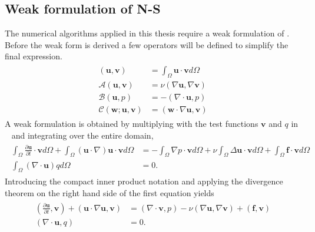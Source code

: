 \subsection{Weak formulation of N-S}
The numerical algorithms applied in this thesis require a weak formulation of .
Before the weak form is derived a few operators will be defined to simplify the final 
expression.
%
\begin{align}
    \begin{split}
    ( \mathbf{u},\mathbf{v}) &= \int_{\Omega}\mathbf{u} \cdot \mathbf{v} d\Omega\\
    \mathcal{A}(\mathbf{u},\mathbf{v}) &= \nu(\nabla \mathbf{u},\nabla \mathbf{v})\\
    \mathcal{B}(\mathbf{u},p) &= -(\nabla \cdot \mathbf{u},p)\\
    \mathcal{C}(\mathbf{w};\mathbf{u},\mathbf{v}) &= (\mathbf{w}\cdot \nabla \mathbf{u},\mathbf{v})
    \end{split}
    \label{eq:weakoperators}
\end{align}
%
A weak formulation is obtained by multiplying with the test functions $\mathbf{v}$ and $q$ in ~ and integrating over
the entire domain,
\begin{align}
    \begin{split}
        \int_{\Omega}\frac{\partial \mathbf{u}}{\partial t}\cdot\mathbf{v}d\Omega
        + \int_{\Omega}(\mathbf{u}\cdot \nabla)\mathbf{u}\cdot\mathbf{v}d\Omega
        &= -\int_{\Omega}\nabla p\cdot \mathbf{v} d\Omega 
        + \nu \int_{\Omega}\Delta\mathbf{u}\cdot\mathbf{v}d\Omega
        + \int_{\Omega}\mathbf{f}\cdot \mathbf{v}d\Omega \\
		\int_{\Omega}(\nabla \cdot \mathbf{u}) qd\Omega &= 0.
    \end{split}
	\label{eq:NSweak1}
\end{align}
Introducing the compact inner product notation and applying the divergence theorem on the right hand side of 
the first equation yields
\begin{align}
    \begin{split}
        (\frac{\partial \mathbf{u}}{\partial t},\mathbf{v})
        + (\mathbf{u}\cdot \nabla\mathbf{u},\mathbf{v})
        &= (\nabla \cdot \mathbf{v} , p ) 
        -\nu(\nabla \mathbf{u},\nabla \mathbf{v})
        + (\mathbf{f},\mathbf{v}) \\
		(\nabla \cdot \mathbf{u},q) &= 0.
    \end{split}
	\label{eq:NSweak}
\end{align}
